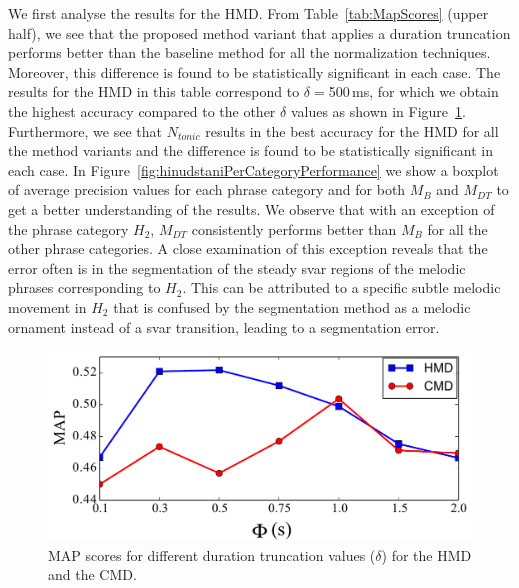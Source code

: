 We first analyse the results for the HMD. From Table~\ref{tab:MapScores} (upper half), we see that the proposed method variant that applies a duration truncation performs better than the baseline method for all the normalization techniques. Moreover, this difference is found to be statistically significant in each case. The results  for the HMD in this table correspond to $\delta=$500\,ms, for which we obtain the highest accuracy compared to the other $\delta$ values as shown in Figure~\ref{fig:map_per_duration_truncation}. Furthermore, we see that $N_{tonic}$ results in the best accuracy for the HMD for all the method variants and the difference is found to be statistically significant in each case. %
In Figure~\ref{fig:hinudstaniPerCategoryPerformance} we show a boxplot of average precision values for each phrase category and for both $M_B$ and $M_{DT}$ to get a better understanding of the results. We observe that with an exception of the phrase category $H_2$, $M_{DT}$ consistently performs better than $M_B$ for all the other phrase categories. A close examination of this exception reveals that the error often is in the segmentation of the steady svar regions of the melodic phrases corresponding to $H_2$. This can be attributed to a specific subtle melodic movement in $H_2$ that is confused by the segmentation method as a melodic ornament instead of a svar transition, leading to a segmentation error.


\begin{figure}
	\begin{center}
		\includegraphics[width=\figSizeEightyFive]{ch06_patterns/figures/ImprovingSimilarity/MAP_per_Duration_Truncation.pdf}
	\end{center}
	\caption{MAP scores for different duration truncation values ($\delta$) for the HMD and the CMD.} 
	\label{fig:map_per_duration_truncation}
\end{figure}

